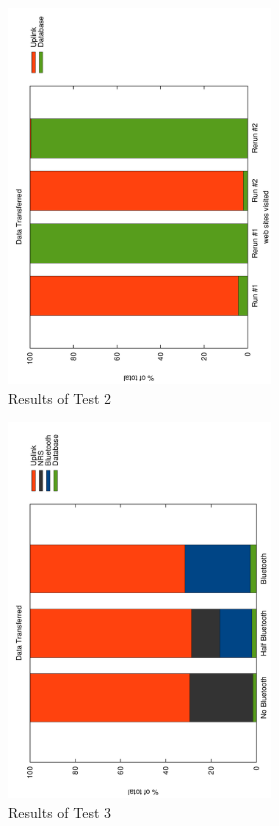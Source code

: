 \begin{figure}[H]
	\centering
		\includegraphics[width=0.62\textwidth, angle=-90]{./img/rerun.pdf}
    	\caption{Results of Test 2}
	\label{fig:frontendtest2}
\end{figure}

\begin{figure}[H]
	\centering
		\includegraphics[width=0.62\textwidth, angle=-90]{./img/half_bt.pdf}
    	\caption{Results of Test 3}
	\label{fig:frontendtest3}
\end{figure}

